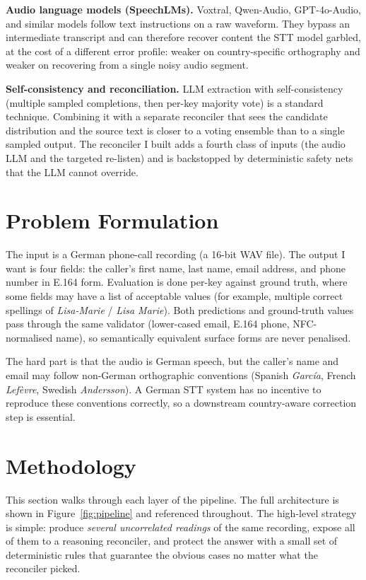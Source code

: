 \documentclass[11pt,a4paper]{article}
\begin{document}
\textbf{Audio language models (SpeechLMs).} Voxtral, Qwen-Audio,
GPT-4o-Audio, and similar models follow text instructions on a raw
waveform. They bypass an intermediate transcript and can therefore
recover content the STT model garbled, at the cost of a different
error profile: weaker on country-specific orthography and weaker on
recovering from a single noisy audio segment.

\textbf{Self-consistency and reconciliation.} LLM extraction with
self-consistency (multiple sampled completions, then per-key majority
vote) is a standard technique. Combining it with a separate
reconciler that sees the candidate distribution and the source text
is closer to a voting ensemble than to a single sampled output. The
reconciler I built adds a fourth class of inputs (the audio LLM and
the targeted re-listen) and is backstopped by deterministic safety
nets that the LLM cannot override.

\section{Problem Formulation}

The input is a German phone-call recording (a 16-bit WAV file). The
output I want is four fields: the caller's first name, last name,
email address, and phone number in E.164 form. Evaluation is done
per-key against ground truth, where some fields may have a list of
acceptable values (for example, multiple correct spellings of
\textit{Lisa-Marie} / \textit{Lisa Marie}). Both predictions and
ground-truth values pass through the same validator (lower-cased
email, E.164 phone, NFC-normalised name), so semantically equivalent
surface forms are never penalised.

The hard part is that the audio is German speech, but the caller's
name and email may follow non-German orthographic conventions
(Spanish \textit{Garc\'ia}, French \textit{Lef\`evre}, Swedish
\textit{Andersson}). A German STT system has no incentive to
reproduce these conventions correctly, so a downstream country-aware
correction step is essential.

\section{Methodology}\label{sec:method}

This section walks through each layer of the pipeline. The full
architecture is shown in Figure~\ref{fig:pipeline} and referenced
throughout. The high-level strategy is simple: produce \emph{several
uncorrelated readings} of the same recording, expose all of them to a
reasoning reconciler, and protect the answer with a small set of
deterministic rules that guarantee the obvious cases no matter what
the reconciler picked.
\end{document}

